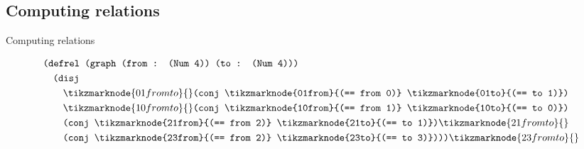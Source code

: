 \documentclass{beamer}
\begin{document}
\subsection{Computing relations}

\begin{frame}{Computing relations}

	\begin{align*}
		& \texttt{(defrel (graph (from : (Num 4)) (to : (Num 4)))} \\
		&\quad \texttt{(disj} \\
		&\quad\quad \tikzmarknode{01fromto}{}\texttt{(conj \tikzmarknode{01from}{(== from 0)} \tikzmarknode{01to}{(== to 1)})} \\
		&\quad\quad \tikzmarknode{10fromto}{}\texttt{(conj \tikzmarknode{10from}{(== from 1)} \tikzmarknode{10to}{(== to 0)})} \\
		&\quad\quad \texttt{(conj \tikzmarknode{21from}{(== from 2)} \tikzmarknode{21to}{(== to 1)})}\tikzmarknode{21fromto}{} \\
		&\quad\quad \texttt{(conj \tikzmarknode{23from}{(== from 2)} \tikzmarknode{23to}{(== to 3)})))}\tikzmarknode{23fromto}{} \\
	\end{align*}

	

\end{frame}
\end{document}
